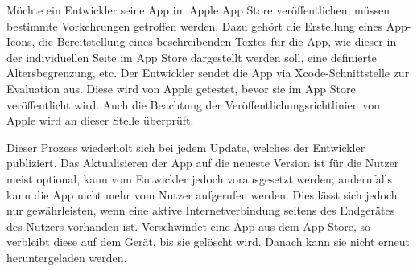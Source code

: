 Möchte ein Entwickler seine App im Apple App Store veröffentlichen, müssen bestimmte Vorkehrungen getroffen werden. Dazu gehört die Erstellung eines App-Icons, die Bereitstellung eines beschreibenden Textes für die App, wie dieser in der individuellen Seite im App Store dargestellt werden soll, eine definierte Altersbegrenzung, etc. Der Entwickler sendet die App via Xcode-Schnittstelle zur Evaluation aus. Diese wird von Apple getestet, bevor sie im App Store veröffentlicht wird. Auch die Beachtung der Veröffentlichungsrichtlinien von Apple wird an dieser Stelle überprüft.

Dieser Prozess wiederholt sich bei jedem Update, welches der Entwickler publiziert. Das Aktualisieren der App auf die neueste Version ist für die Nutzer meist optional, kann vom Entwickler jedoch vorausgesetzt werden; andernfalls kann die App nicht mehr vom Nutzer aufgerufen werden. Dies lässt sich jedoch nur gewährleisten, wenn eine aktive Internetverbindung seitens des Endgerätes des Nutzers vorhanden ist. Verschwindet eine App aus dem App Store, so verbleibt diese auf dem Gerät, bis sie gelöscht wird. Danach kann sie nicht erneut heruntergeladen werden.
